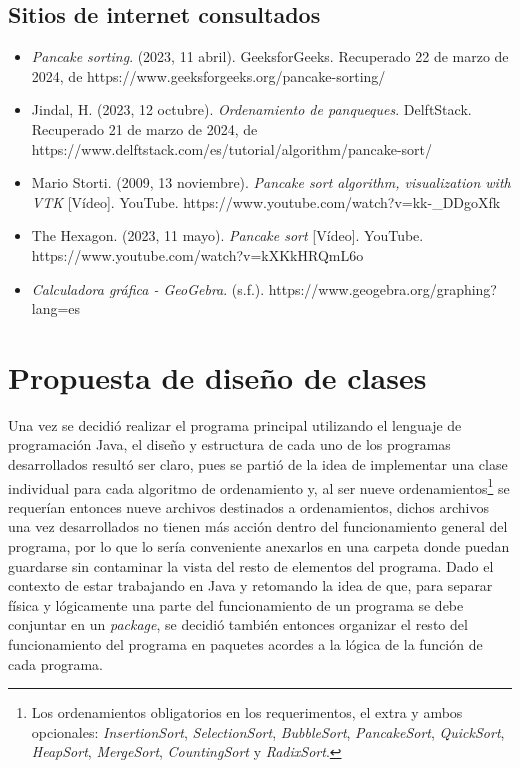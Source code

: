 \documentclass[a4paper,12pt]{article}
\begin{document}
\subsection{Sitios de internet consultados}

\begin{itemize}
    \item \textit{Pancake sorting}. (2023, 11 abril). GeeksforGeeks. Recuperado 22 de marzo de 2024, de https://www.geeksforgeeks.org/pancake-sorting/
    \item Jindal, H. (2023, 12 octubre). \textit{Ordenamiento de panqueques}. DelftStack. Recuperado 21 de marzo de 2024, de https://www.delftstack.com/es/tutorial/algorithm/pancake-sort/
    \item Mario Storti. (2009, 13 noviembre). \textit{Pancake sort algorithm, visualization with VTK} [Vídeo]. YouTube. https://www.youtube.com/watch?v=kk-\_DDgoXfk
    \item The Hexagon. (2023, 11 mayo). \textit{Pancake sort} [Vídeo]. YouTube.\\https://www.youtube.com/watch?v=kXKkHRQmL6o
    \item \textit{Calculadora gráfica - GeoGebra}. (s.f.). https://www.geogebra.org/graphing?lang=es
\end{itemize}

\section{Propuesta de diseño de clases}

Una vez se decidió realizar el programa principal utilizando el lenguaje de programación Java, el diseño y estructura de cada uno de los programas desarrollados resultó ser claro, pues se partió de la idea de implementar una clase individual para cada algoritmo de ordenamiento y, al ser nueve ordenamientos\footnote{Los ordenamientos obligatorios en los requerimentos, el extra y ambos opcionales: \textit{InsertionSort}, \textit{SelectionSort}, \textit{BubbleSort}, \textit{PancakeSort}, \textit{QuickSort}, \textit{HeapSort}, \textit{MergeSort}, \textit{CountingSort} y \textit{RadixSort}.} se requerían entonces nueve archivos destinados a ordenamientos, dichos archivos una vez desarrollados no tienen más acción dentro del funcionamiento general del programa, por lo que lo sería conveniente anexarlos en una carpeta donde puedan guardarse sin contaminar la vista del resto de elementos del programa. Dado el contexto de estar trabajando en Java y retomando la idea de que, para separar física y lógicamente una parte del funcionamiento de un programa se debe conjuntar en un \textit{package}, se decidió también entonces organizar el resto del funcionamiento del programa en paquetes acordes a la lógica de la función de cada programa.
\end{document}
